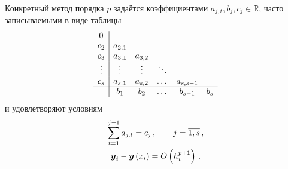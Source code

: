 \documentclass[../document.tex]{subfiles}
\begin{document}
				Конкретный метод порядка $p$ задаётся коэффициентами $a_{j,t},b_j,c_j\in\mathbb{R}$, часто записываемыми в виде таблицы
				\begin{equation}
					\begin{array}{c|ccccc}
						0 & \multicolumn{5}{c}{}\\
						c_2 & a_{2,1} & \multicolumn{4}{c}{}\\
						c_3 & a_{3,1} & a_{3,2} & \multicolumn{3}{c}{}\\
						\vdots & \vdots & \vdots & \ddots & \multicolumn{2}{c}{}\\
						c_s & a_{s,1} & a_{s,2} & \dots & a_{s,s-1} & \\
						\hline
						& b_1 & b_2 & \dots & b_{s-1} & b_s
					\end{array}
				\end{equation}
				и удовлетворяют условиям
				\begin{gather}
					\sum\limits_{t=1}^{j-1}a_{j,t}=c_j\,,\qquad j=\overline{1,s}\,,\\
					\boldsymbol{y}_i-\boldsymbol{y}\left(x_i\right)=O\left(h_i^{p+1}\right)\,.
				\end{gather}
\end{document}
